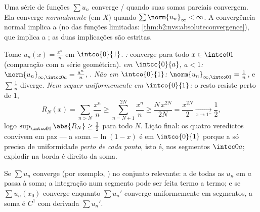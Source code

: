 \begin{definition}\label{def:b2:funcseq:series}
Uma série de funções $\sum u_n$ converge / quando
suas somas parciais convergem. Ela converge
\emph{normalmente} (em $X$) quando $\sum
\norm{u_n}_\infty < \infty$. A convergência normal implica a  (no  das funções limitadas:
\cref{thm:b2:nvs:absoluteconvergence}), que implica a ;
as duas implicações são estritas.
\end{definition}

\begin{example}\label{ex:b2:funcseq:threemodes}
Tome $u_n(x) = \frac{x^n}{n}$ em $\intco{0}{1}$. \emph{:}
converge para todo $x \in \intco01$ (comparação com a
série geométrica). \emph{ em $\intcc{0}{a}$, $a < 1$:}
$\norm{u_n}_{\infty,\intcc0a} = \frac{a^n}{n}$, .
\emph{Não  em $\intco{0}{1}$:}
$\norm{u_n}_{\infty,\intco01} = \frac1n$, e $\sum\frac1n$
diverge. \emph{Nem sequer uniformemente em $\intco{0}{1}$:} o
resto resiste perto de $1$,
\[
R_N(x) = \sum_{n>N}\frac{x^n}{n}
\geq \sum_{n=N+1}^{2N}\frac{x^n}{n}
\geq \frac{N\,x^{2N}}{2N} = \frac{x^{2N}}{2}
\xrightarrow[x\to1^-]{} \frac12 ,
\]
logo $\sup_{\intco01}\abs{R_N} \geq \frac12$ para todo $N$.
Lição final: os quatro veredictos convivem em paz --- a
soma $-\ln(1-x)$ é  em $\intco{0}{1}$ porque a
 só precisa de uniformidade \emph{perto de cada ponto}, isto é,
nos segmentos $\intcc0a$; explodir na borda é direito da
soma.
\end{example}

\begin{theorem}\label{thm:b2:funcseq:seriestransfer}
Se $\sum u_n$ converge  (por exemplo, ) no
conjunto relevante: a  de todas as $u_n$ em $a$ passa à soma; a integração
num segmento pode ser feita termo a termo; e se $\sum u_n(x_0)$
converge enquanto $\sum u_n'$ converge uniformemente em segmentos, a
soma é $C^1$ com derivada $\sum u_n'$.
\end{theorem}

